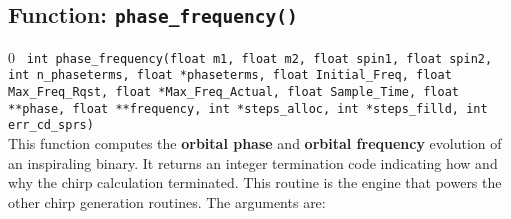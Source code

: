\subsection{Function: {\tt phase\_frequency()}}
\label{ss:phase_frequency}
\setcounter{equation}0
{\tt
int phase\_frequency(float m1, float m2, float spin1, float spin2, int n\_phaseterms,
   float *phaseterms, float Initial\_Freq, float Max\_Freq\_Rqst,
   float *Max\_Freq\_Actual, float Sample\_Time, float **phase, float **frequency,
   int *steps\_alloc, int *steps\_filld, int err\_cd\_sprs)
}\\
This function computes the {\bf orbital  phase} 
and {\bf orbital frequency} evolution of
an inspiraling binary. It returns an integer termination code
indicating how and why the chirp calculation terminated.
This routine is the engine that powers the other chirp generation
routines.
The arguments are:
